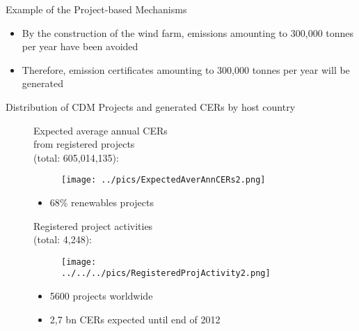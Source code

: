 

{Example of the Project-based Mechanisms}
\begin{itemize}
\item<1-> By the construction of the wind farm, emissions amounting to 300,000 tonnes per year have been avoided
\item<2-> Therefore, emission certificates amounting to 300,000 tonnes per year will be generated
\end{itemize}




{Distribution of CDM Projects and generated CERs by host country }
\begin{figure}[t]
\begin{minipage}[t]{0.475\textwidth}
Expected average annual CERs \\
from registered projects \\
(total: 605,014,135):
\vspace*{-0.7cm}
\begin{figure}
\centering
\texttt{[image: ../pics/ExpectedAverAnnCERs2.png]}
\end{figure}
\vspace*{-0.8cm}
\begin{itemize}
\item<1-> 68\% renewables projects %
\end{itemize}
\vspace*{-0.9cm}

\end{minipage}
\begin{minipage}[t]{0.475\textwidth}
Registered project activities\\
(total: 4,248):
\vspace*{-0.7cm}
\begin{figure}
\centering
\texttt{[image: ../../../pics/RegisteredProjActivity2.png]}
\end{figure}
\vspace*{-0.8cm}
\begin{itemize}
\item<1-> 5600  projects worldwide
\item<2-> 2,7 bn CERs expected until end of 2012
\end{itemize}
\end{minipage}
\end{figure}




